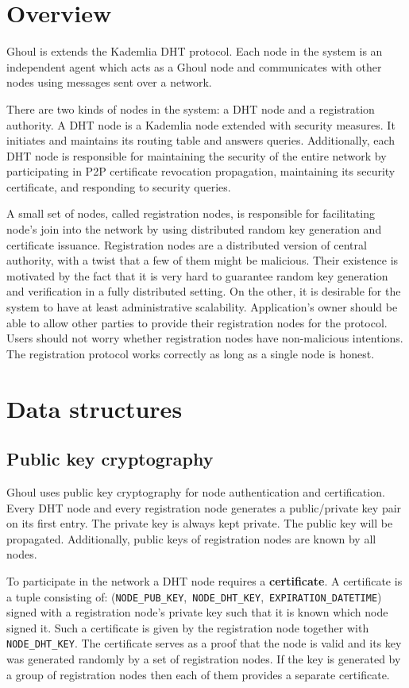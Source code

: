 \section{Overview}
\label{sec:ghoul_overview}
Ghoul is extends the Kademlia DHT protocol. Each node in the system is an
independent agent which acts as a Ghoul node and communicates with other nodes
using messages sent over a network.

There are two kinds of nodes in the system: a DHT node and a registration
authority. A DHT node is a Kademlia node extended with security measures.
It initiates and maintains its routing table and answers queries. Additionally,
each DHT node is responsible for maintaining the security of the entire network
by participating in P2P certificate revocation propagation, maintaining its
security certificate, and responding to security queries.

A small set of nodes, called registration nodes, is responsible for facilitating
node’s join into the network by using distributed random key generation and
certificate issuance. Registration nodes are a distributed version of central
authority, with a twist that a few of them might be malicious. Their existence
is motivated by the fact that it is very hard to guarantee random key generation
and verification in a fully distributed setting. On the other, it is desirable
for the system to have at least administrative scalability. Application's owner
should be able to allow other parties to provide their registration nodes for
the protocol. Users should not worry whether registration nodes have
non-malicious intentions. The registration protocol works correctly as long as a
single node is honest.

\section{Data structures}
\label{sec:ghoul_data}

\subsection{Public key cryptography}
Ghoul uses public key cryptography for node authentication and certification.
Every DHT node and every registration node generates a public/private key pair
on its first entry. The private key is always kept private. The public key will
be propagated. Additionally, public keys of registration nodes are known by all
nodes.

To participate in the network a DHT node requires a \textbf{certificate}.
A certificate is a tuple consisting of:
(\texttt{NODE\_PUB\_KEY},~\texttt{NODE\_DHT\_KEY},~\texttt{EXPIRATION\_DATETIME})
signed with a registration node's private key such that it is known which node
signed it. Such a certificate is given by the registration node together with
\texttt{NODE\_DHT\_KEY}. The certificate serves as a proof that the node is
valid and its key was generated randomly by a set of registration nodes. If the
key is generated by a group of registration nodes then each of them provides a
separate certificate.

